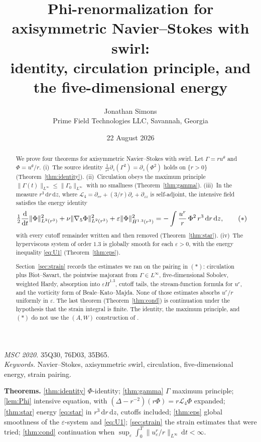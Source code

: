 \documentclass[11pt]{article}
\title{Phi-renormalization for axisymmetric Navier--Stokes with swirl:\\
identity, circulation principle, and the five-dimensional energy}
\author{Jonathan Simons\\
Prime Field Technologies LLC, Savannah, Georgia}
\date{22 August 2026}
\theoremstyle{definition}
\newcommand{\eps}{\varepsilon}
\newcommand{\dd}{\mathrm{d}}
\newcommand{\ddt}{\frac{\mathrm{d}}{\mathrm{d}t}}
\newcommand{\ur}{u^{r}}
\newcommand{\ut}{u^{\theta}}
\newcommand{\Ph}{\Phi}
\newcommand{\Ga}{\Gamma}
\newcommand{\Lfour}{\mathcal{L}_{4}}
\newcommand{\gradfive}{\nabla_{5}}
\newcommand{\Hdot}{\dot{H}}
\newcommand{\Lint}{L^{\infty}}
\newcommand{\norm}[2]{\|#1\|_{#2}}
\begin{document}
\maketitle

\begin{abstract}
We prove four theorems for axisymmetric Navier--Stokes with swirl.
Let \(\Ga=r\ut\) and \(\Ph=\ut/r\).
(i)~The source identity
\(\frac1{r^4}\partial_z(\Ga^2)=\partial_z(\Ph^2)\)
holds on \(\{r>0\}\)
(Theorem~\ref{thm:identity}).
(ii)~Circulation obeys the maximum principle
\(\norm{\Ga(t)}{\Lint}\le\norm{\Ga_0}{\Lint}\)
with no smallness
(Theorem~\ref{thm:gamma}).
(iii)~In the measure \(r^3\,\dd r\,\dd z\), where
\(\Lfour=\partial_{rr}+(3/r)\partial_r+\partial_{zz}\) is self-adjoint,
the intensive field satisfies the energy identity
\begin{equation*}
\tfrac12\ddt\norm{\Ph}{L^2(r^3)}^2
+\nu\norm{\gradfive\Ph}{L^2(r^3)}^2
+\eps\norm{\Ph}{\Hdot^{1.3}(r^3)}^2
=-\int\frac{\ur}{r}\,\Ph^2\,r^3\,\dd r\,\dd z,
\tag{\ensuremath{*}}
\end{equation*}
with every cutoff remainder written and then removed
(Theorem~\ref{thm:star}).
(iv)~The hyperviscous system of order \(1.3\) is globally smooth for
each \(\eps>0\), with the energy inequality \eqref{eq:U1}
(Theorem~\ref{thm:eps}).

Section~\ref{sec:strain} records the estimates we ran on the pairing
in \((*)\): circulation plus Biot--Savart, the pointwise majorant from
\(\Ga\in\Lint\), five-dimensional Sobolev, weighted Hardy, absorption
into \(\eps\Hdot^{1.3}\), cutoff tails, the stream-function formula for
\(\ur\), and the vorticity form of Beale--Kato--Majda.
None of those estimates absorbs \(\ur/r\) uniformly in \(\eps\).
The last theorem
(Theorem~\ref{thm:cond})
is continuation under the hypothesis that the strain integral is finite.
The identity, the maximum principle, and \((*)\) do not use the
\((A,W)\) construction of \cite{ShahJun}.
\end{abstract}

\noindent\textit{MSC 2020.} 35Q30, 76D03, 35B65.\\
\textit{Keywords.} Navier--Stokes, axisymmetric swirl, circulation,
five-dimensional energy, strain pairing.

\tableofcontents
\vspace{0.75em}

\begin{mdframed}[linewidth=0.9pt]
\textbf{Theorems.}
\ref{thm:identity} \(\Ph\)-identity;
\ref{thm:gamma} \(\Ga\) maximum principle;
\ref{lem:Phi} intensive equation, with
\((\Delta-r^{-2})(r\Ph)=r\Lfour\Ph\) expanded;
\ref{thm:star} energy \eqref{eq:star} in \(r^3\,\dd r\,\dd z\), cutoffs
included;
\ref{thm:eps} global smoothness of the \(\eps\)-system and \eqref{eq:U1};
\ref{sec:strain} the strain estimates that were tried;
\ref{thm:cond} continuation when
\(\sup_\eps\int_0^T\norm{\ur_\eps/r}{\Lint}\,\dd t<\infty\).
\end{mdframed}
\end{document}
